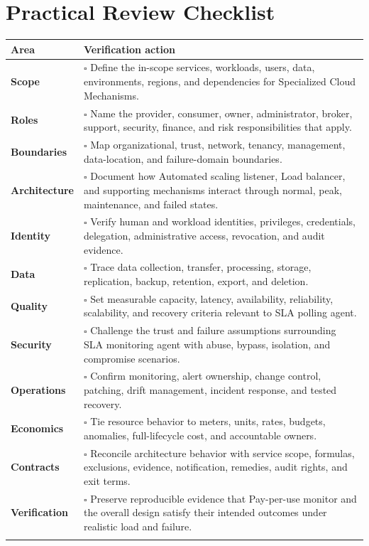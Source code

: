 \documentclass[11pt]{article}
\begin{document}
\section{Practical Review Checklist}
\begin{longtable}{@{}>{\bfseries\color{Teal}}p{}>{\RaggedRight\arraybackslash}p{}@{}}
\toprule\textbf{Area} & \textbf{Verification action}\\\midrule\endhead
Scope & $\square$ Define the in-scope services, workloads, users, data, environments, regions, and dependencies for Specialized Cloud Mechanisms. \\\addlinespace[2pt]
Roles & $\square$ Name the provider, consumer, owner, administrator, broker, support, security, finance, and risk responsibilities that apply. \\\addlinespace[2pt]
Boundaries & $\square$ Map organizational, trust, network, tenancy, management, data-location, and failure-domain boundaries. \\\addlinespace[2pt]
Architecture & $\square$ Document how Automated scaling listener, Load balancer, and supporting mechanisms interact through normal, peak, maintenance, and failed states. \\\addlinespace[2pt]
Identity & $\square$ Verify human and workload identities, privileges, credentials, delegation, administrative access, revocation, and audit evidence. \\\addlinespace[2pt]
Data & $\square$ Trace data collection, transfer, processing, storage, replication, backup, retention, export, and deletion. \\\addlinespace[2pt]
Quality & $\square$ Set measurable capacity, latency, availability, reliability, scalability, and recovery criteria relevant to SLA polling agent. \\\addlinespace[2pt]
Security & $\square$ Challenge the trust and failure assumptions surrounding SLA monitoring agent with abuse, bypass, isolation, and compromise scenarios. \\\addlinespace[2pt]
Operations & $\square$ Confirm monitoring, alert ownership, change control, patching, drift management, incident response, and tested recovery. \\\addlinespace[2pt]
Economics & $\square$ Tie resource behavior to meters, units, rates, budgets, anomalies, full-lifecycle cost, and accountable owners. \\\addlinespace[2pt]
Contracts & $\square$ Reconcile architecture behavior with service scope, formulas, exclusions, evidence, notification, remedies, audit rights, and exit terms. \\\addlinespace[2pt]
Verification & $\square$ Preserve reproducible evidence that Pay-per-use monitor and the overall design satisfy their intended outcomes under realistic load and failure. \\\addlinespace[2pt]
\bottomrule
\end{longtable}
\end{document}
